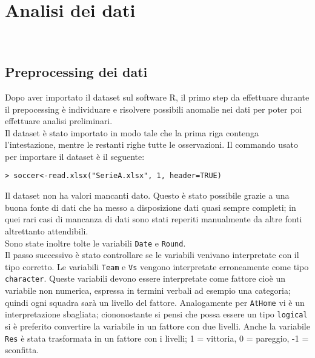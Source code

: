 
\chapter{Analisi dei dati}
\\


\section{Preprocessing dei dati}
Dopo aver importato il dataset sul software R, il primo step da effettuare durante il prepocessing è individuare e risolvere possibili anomalie nei dati per poter poi effettuare analisi preliminari.\\
Il dataset è stato importato in modo tale che la prima riga contenga l'intestazione, mentre le restanti righe tutte le osservazioni. Il commando usato per importare il dataset è il seguente:\\

\begin{lstlisting}
> soccer<-read.xlsx("SerieA.xlsx", 1, header=TRUE)
\end{lstlisting}
\bigskip
Il dataset non ha valori mancanti dato. Questo è stato possibile grazie a una buona fonte di dati che ha messo a disposizione dati quasi sempre completi; in quei rari casi di mancanza di dati sono stati reperiti manualmente da altre fonti altrettanto attendibili.\\
Sono state inoltre tolte le variabili \texttt{Date} e \texttt{Round}.\\
Il passo successivo è stato controllare se le variabili venivano interpretate con il tipo corretto. Le variabili \texttt{Team} e \texttt{Vs} vengono interpretate erroneamente come tipo \texttt{character}. Queste variabili devono essere interpretate come fattore cioè un variabile non numerica, espressa in termini verbali ad esempio una categoria; quindi ogni squadra sarà un livello del fattore. Analogamente per \texttt{AtHome} vi è un interpretazione sbagliata; ciononostante si pensi che possa essere un tipo \texttt{logical} si è preferito convertire la variabile in un fattore con due livelli. Anche la variabile \texttt{Res} è stata trasformata in un fattore con i livelli; 1 = vittoria, 0 = pareggio, -1 = sconfitta.


